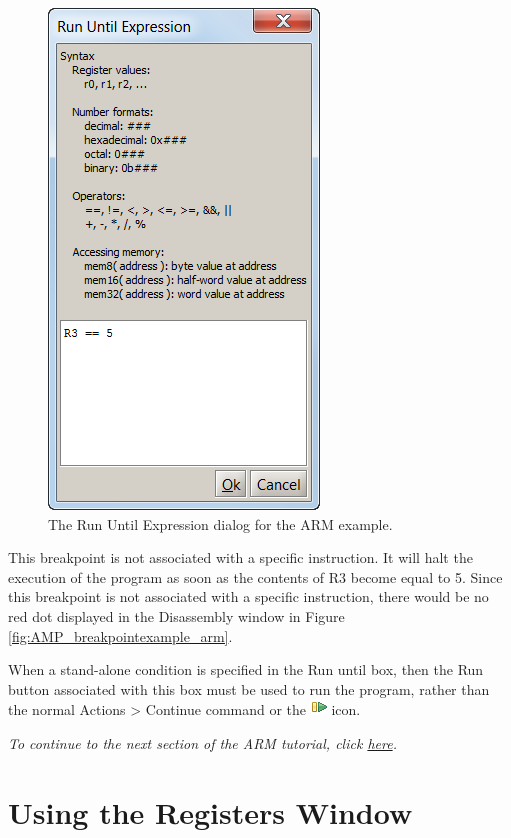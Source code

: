 \documentclass[11pt, twoside, pdftex]{article}
\begin{document}
\begin{figure}[H]
   \begin{center}
      \includegraphics[scale=1]{screenshots/figure32.png}
   \end{center}
   \caption{The Run Until Expression dialog for the ARM example.} 
   \label{fig:AMP_rununtilexpression_arm}
\end{figure}

This breakpoint is not associated with a specific instruction. It
will halt the execution of the program as soon as the contents
of R3 become equal to 5.
Since this breakpoint is not associated with a specific
instruction, there would be no red dot displayed in the
Disassembly window in Figure \ref{fig:AMP_breakpointexample_arm}. 

When a stand-alone condition is specified in the {\sf Run until}
box, then the Run button associated with this box must be used to
run the program, rather than the normal {\sf Actions > Continue} command or the \includegraphics{toolbar/continue.png} icon.  

{\it To continue to the next section of the ARM tutorial, click \hyperref[tut:arm_4]{here}.}  

\clearpage
\newpage
\section{Using the Registers Window}
\end{document}
